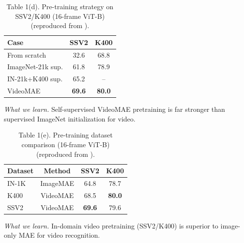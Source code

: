 \begin{enrichment}
\begin{enrichment}
    \begin{table}[H]
        \centering
        \small
        \setlength{\tabcolsep}{6pt}
        \caption{Table 1(d). Pre-training strategy on SSV2/K400 (16-frame ViT-B) (reproduced from \cite{tong2022_videomae}).}
        \label{tab:videomae_tbl1d}
        \begin{tabular}{lcc}
            \toprule
            Case & SSV2 & K400 \\
            \midrule
            From scratch      & 32.6 & 68.8 \\
            ImageNet-21k sup. & 61.8 & 78.9 \\
            IN-21k+K400 sup.  & 65.2 & -- \\
            VideoMAE          & \textbf{69.6} & \textbf{80.0} \\
            \bottomrule
        \end{tabular}
    \end{table}
    \noindent\emph{What we learn.} Self-supervised VideoMAE pretraining is far stronger than supervised ImageNet initialization for video.
    
    \begin{table}[H]
        \centering
        \small
        \setlength{\tabcolsep}{6pt}
        \caption{Table 1(e). Pre-training dataset comparison (16-frame ViT-B) (reproduced from \cite{tong2022_videomae}).}
        \label{tab:videomae_tbl1e}
        \begin{tabular}{lccc}
            \toprule
            Dataset & Method & SSV2 & K400 \\
            \midrule
            IN-1K  & ImageMAE & 64.8 & 78.7 \\
            K400   & VideoMAE & 68.5 & \textbf{80.0} \\
            SSV2   & VideoMAE & \textbf{69.6} & 79.6 \\
            \bottomrule
        \end{tabular}
    \end{table}
    \noindent\emph{What we learn.} In-domain video pretraining (SSV2/K400) is superior to image-only MAE for video recognition.
    

\end{enrichment}
\end{enrichment}
